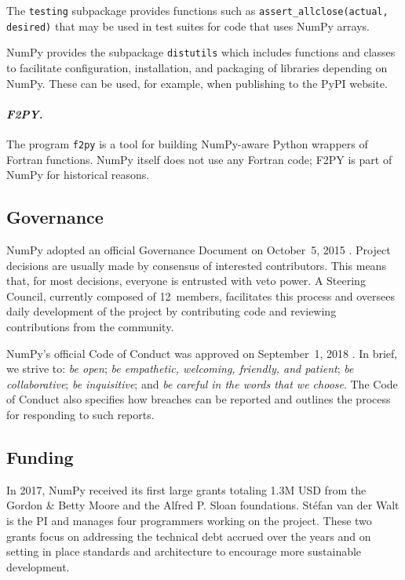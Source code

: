 \documentclass[twocolumn]{article}
\begin{document}
The \texttt{testing} subpackage provides functions such as
\texttt{assert\_allclose(actual, desired)} that may be used in
test suites for code that uses NumPy arrays.

NumPy provides the subpackage \texttt{distutils} which includes functions and classes
to facilitate configuration, installation, and packaging of libraries depending on NumPy.
These can be used, for example, when publishing to the PyPI website.

\paragraph{\emph{F2PY.}}  The program \texttt{f2py} is a tool for
building NumPy-aware Python wrappers of Fortran functions.
NumPy itself does not use any Fortran code;  F2PY is part of NumPy
for historical reasons.


\subsection*{Governance}

NumPy adopted an official Governance Document on October~5,
2015 \cite{NumPyProjectGovernance}.
Project decisions are usually made by consensus of interested contributors.
This means that, for most decisions, everyone is entrusted with veto power.
A Steering Council, currently composed of 12~members, facilitates this
process and oversees daily development of the project by contributing code
and reviewing contributions from the community.

NumPy's official Code of Conduct was approved on September~1, 2018 \cite{NumPyCodeofConduct}.
In brief, we strive to:
\emph{be open};
\emph{be empathetic, welcoming, friendly, and patient};
\emph{be collaborative};
\emph{be inquisitive}; and
\emph{be careful in the words that we choose}.
The Code of Conduct also specifies how breaches can be reported and outlines
the process for responding to such reports.

\subsection*{Funding}

In 2017, NumPy received its first large grants totaling 1.3M USD from the
Gordon \& Betty Moore and the Alfred P. Sloan foundations.
Stéfan van der Walt is the PI and manages four programmers working on the project.
These two grants focus on addressing the technical debt accrued over the years and
on setting in place standards and architecture to encourage more sustainable development.
\end{document}

